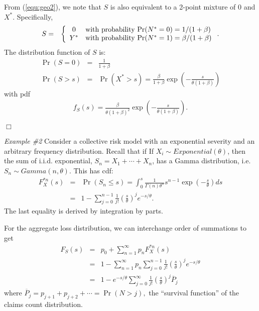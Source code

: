 \documentclass[12pt,letterpaper]{article}
\begin{document}
From (\ref{equ:geo2}), we note that $S$ is also equivalent to a 2-point mixture of 0 and $X^{*}$. Specifically,
\begin{eqnarray*}
S &=&
\left\{
\begin{array}{cl}
0 & {\rm with~ probability ~Pr}(N^*=0) = 1/(1+\beta) \\
Y^{*} & {\rm with~ probability ~Pr}(N^*=1) = \beta/(1+\beta)
\end{array}
\right..
\end{eqnarray*}
The distribution function of $S$ is:
\begin{eqnarray*}
\Pr(S=0) &=& \frac{1}{1+\beta}\\
\Pr(S>s) &=& \Pr(X^*>s) =\frac{\beta}{1+\beta} \exp\left( -\frac{s}{
\theta (1+\beta)}\right)
\end{eqnarray*}
with pdf
\begin{eqnarray*}
f_{S}(s) = \frac{\beta}{\theta (1+\beta)^2}\exp\left( -\frac{s}{
\theta (1+\beta)}\right).
\end{eqnarray*}
\begin{flushright}$\Box$\end{flushright}


\bigskip

\textit{Example \#2} Consider a collective risk model with an exponential severity and an arbitrary frequency distribution. Recall that if If $X_i\sim Exponential(\theta)$, then the sum of i.i.d. exponential, $S_n=X_1+\cdots+X_n$, has a Gamma distribution, i.e. $S_n\sim Gamma(n,\theta)$. This has cdf:
\begin{eqnarray*}
F_{X}^{\ast n}(s) &=& \Pr (S_n \le s) = \int_{0}^{s} \frac{1}{\Gamma(n)\theta^n}s^{n-1}\exp\left(-\frac{s}{\theta}\right) ds\\
&=& 1-\sum_{j=0}^{n-1}\frac{1}{j!}\left( \frac{s}{\theta}\right)^j e^{-s/\theta } .
\end{eqnarray*}
The last equality is derived by integration by parts.

For the aggregate loss distribution, we can interchange order of summations to get
\begin{eqnarray*}
F_{S}\left(s\right) &=& p_{0}+\sum_{n=1}^{\infty }p_n F_{X}^{\ast n}\left(s\right)\\
&=& 1 - \sum_{n=1}^{\infty }p_n \sum_{j=0}^{n-1}\frac{1}{j!}
\left( \frac{s}{\theta}\right)^j e^{-s/\theta }\\
&=& 1-e^{-s/\theta}\sum_{j=0}^{\infty} \frac{1}{j!}
\left( \frac{s}{\theta} \right)^j \overline{P}_j
\end{eqnarray*}
where $\overline{P}_j =p_{j+1}+p_{j+2}+\cdots = \Pr (N>j),$ the ``survival function'' of the claims count distribution.
\bigskip
\end{document}
